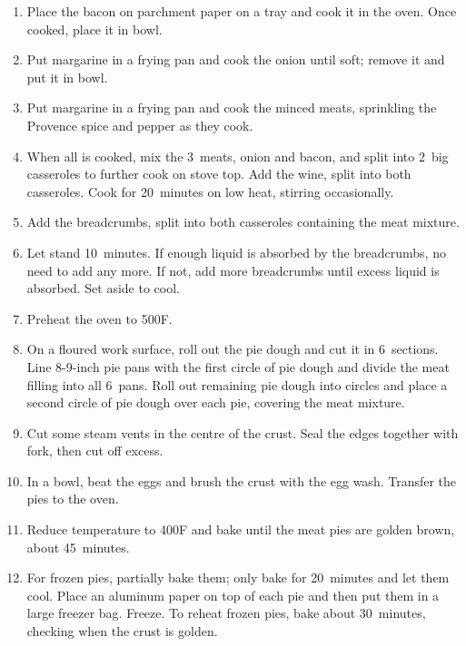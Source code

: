 \begin{enumerate}
    \item Place the bacon on parchment paper on a tray and cook it in the oven. Once cooked, place it in bowl.
    \item Put margarine in a frying pan and cook the onion until soft; remove it and put it in bowl.
    \item Put margarine in a frying pan and cook the minced meats, sprinkling the Provence spice and pepper as they cook.
    \item When all is cooked, mix the 3~meats, onion and bacon, and split into 2~big casseroles to further cook on stove top. Add the wine, split into both casseroles. Cook for 20~minutes on low heat, stirring occasionally.
    \item Add the breadcrumbs, split into both casseroles containing the meat mixture.
    \item Let stand 10~minutes. If enough liquid is absorbed by the breadcrumbs, no need to add any more. If not, add more breadcrumbs until excess liquid is absorbed. Set aside to cool.
    \item Preheat the oven to 500\degree F.
    \item On a floured work surface, roll out the pie dough and cut it in 6~sections. Line 8-9-inch pie pans with the first circle of pie dough and divide the meat filling into all 6~pans. Roll out remaining pie dough into circles and place a second circle of pie dough over each pie, covering the meat mixture.
    \item Cut some steam vents in the centre of the crust. Seal the edges together with fork, then cut off excess.
    \item In a bowl, beat the eggs and brush the crust with the egg wash. Transfer the pies to the oven.
    \item Reduce temperature to 400\degree F and bake until the meat pies are golden brown, about 45~minutes.
    \item For frozen pies, partially bake them; only bake for 20~minutes and let them cool. Place an aluminum paper on top of each pie and then put them in a large freezer bag. Freeze. To reheat frozen pies, bake about 30~minutes, checking when the crust is golden.
\end{enumerate}
